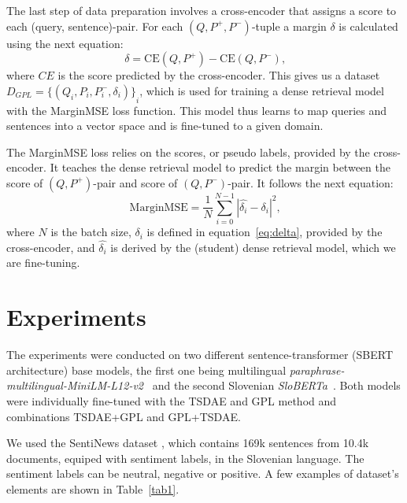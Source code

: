 \documentclass[fleqn,moreauthors,10pt]{ds_report}
\begin{document}
The last step of data preparation involves a cross-encoder that assigns a score to each (query, sentence)-pair. For each $(Q, P^{+}, P^{-})$-tuple a margin $\delta$ is calculated using the next equation:
\begin{equation}
	\delta = \text{CE}(Q, P^{+}) - \text{CE}(Q, P^{-})\text{,}
\label{eq:delta}
\end{equation}
where $CE$ is the score predicted by the cross-encoder. This gives us a dataset $D_{GPL} = {\{ ( Q_i, P_i, P_i^{-}, \delta_i ) \}}_i$, which is used for training a dense retrieval model with the MarginMSE loss function. This model thus learns to map queries and sentences into a vector space and is fine-tuned to a given domain.

The MarginMSE loss \cite{marginMSE} relies on the scores, or pseudo labels, provided by the cross-encoder. It teaches the dense retrieval model to predict the margin between the score of $(Q, P^{+})$-pair and score of $(Q, P^{-})$-pair. It follows the next equation:
\begin{equation}
	\text{MarginMSE} = \frac{1}{N} \sum_{i=0}^{N-1} |\hat{\delta_i} - \delta_i|^{2} \text{,}
\label{eq:margin}
\end{equation}
where $N$ is the batch size, $\delta_i$ is defined in equation~\ref{eq:delta}, provided by the cross-encoder, and $\hat{\delta_i}$ is derived by the (student) dense retrieval model, which we are fine-tuning.





\section*{Experiments}
The experiments were conducted on two different sentence-transformer (SBERT architecture) base models, the first one being multilingual {\it paraphrase-multilingual-MiniLM-L12-v2}~\cite{reimers-2019-sentence-bert} and the second Slovenian {\it SloBERTa}~\cite{sloberta}. Both models were individually fine-tuned with the TSDAE and GPL method and combinations TSDAE+GPL and GPL+TSDAE.

We used the SentiNews dataset \cite{sentiNews}, which contains 169k sentences from 10.4k documents, equiped with sentiment labels, in the Slovenian language. The sentiment labels can be neutral, negative or positive. A few examples of dataset's elements are shown in Table~\ref{tab1}.
\end{document}
